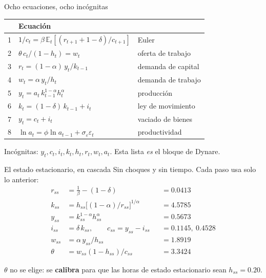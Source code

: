 \begin{frame}[label=equilibrio]{Ocho ecuaciones, ocho incógnitas}
  \centering\small
  \renewcommand{\arraystretch}{1.35}
  \begin{tabular}{@{}lll@{}}
    \toprule
    & \textbf{Ecuación} & \\
    \midrule
    1 & $1/c_t=\beta\,\mathbb{E}_t[(r_{t+1}+1-\delta)/c_{t+1}]$ & Euler\\
    2 & $\theta\,c_t/(1-h_t)=w_t$ & oferta de trabajo\\
    3 & $r_t=(1-\alpha)\,y_t/k_{t-1}$ & demanda de capital\\
    4 & $w_t=\alpha\,y_t/h_t$ & demanda de trabajo\\
    5 & $y_t=a_t\,k_{t-1}^{1-\alpha}h_t^{\alpha}$ & producción\\
    6 & $k_t=(1-\delta)\,k_{t-1}+i_t$ & ley de movimiento\\
    7 & $y_t=c_t+i_t$ & vaciado de bienes\\
    8 & $\ln a_t=\phi\ln a_{t-1}+\sigma_\varepsilon\varepsilon_t$ & productividad\\
    \bottomrule
  \end{tabular}
  \par\vspace{0.35cm}\raggedright
  Incógnitas: $y_t,c_t,i_t,k_t,h_t,r_t,w_t,a_t$. Esta lista \emph{es} el bloque
   de Dynare.
\end{frame}

\begin{frame}[label=ee]{El estado estacionario, en cascada}
  Sin choques y sin tiempo. Cada paso usa solo lo anterior:
  \vspace{0.15cm}
  \begin{align*}
    r_{ss}&=\tfrac{1}{\beta}-(1-\delta) &&= 0.0413 \\
    k_{ss}&=h_{ss}\big[(1-\alpha)/r_{ss}\big]^{1/\alpha} &&= 4.5785\\
    y_{ss}&=k_{ss}^{1-\alpha}h_{ss}^{\alpha} &&= 0.5673\\
    i_{ss}&=\delta\,k_{ss},\qquad c_{ss}=y_{ss}-i_{ss} &&= 0.1145,\ 0.4528\\
    w_{ss}&=\alpha\,y_{ss}/h_{ss} &&= 1.8919\\
    \theta&=w_{ss}(1-h_{ss})/c_{ss} &&= \num{3.3424}
  \end{align*}
  \par\vspace{0.1cm}
  $\theta$ no se elige: se \textbf{calibra} para que las horas de estado estacionario
  sean $h_{ss}=0.20$.
\end{frame}


